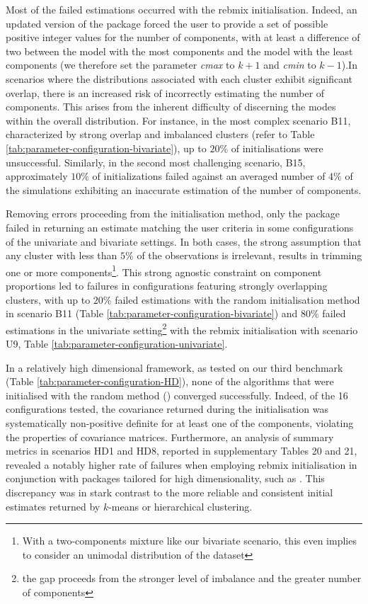 Most of the failed estimations occurred with the rebmix initialisation. Indeed, an updated version of the package forced the user to provide a set of possible positive integer values for the number of components, with at least a difference of two between the model with the most components and the model with the least components (we therefore set the parameter \emph{cmax} to \(k+1\) and \emph{cmin} to \(k-1\)).In scenarios where the distributions associated with each cluster exhibit significant overlap, there is an increased risk of incorrectly estimating the number of components. This arises from the inherent difficulty of discerning the modes within the overall distribution. For instance, in the most complex scenario B11, characterized by strong overlap and imbalanced clusters (refer to Table \ref{tab:parameter-configuration-bivariate}), up to \(20\%\) of initialisations were unsuccessful. Similarly, in the second most challenging scenario, B15, approximately \(10\%\) of initializations failed against an averaged number of \(4\%\) of the simulations exhibiting an inaccurate estimation of the number of components.

Removing errors proceeding from the initialisation method, only the  package failed in returning an estimate matching the user criteria in some configurations of the univariate and bivariate settings. In both cases, the strong assumption that any cluster with less than \(5\%\) of the observations is irrelevant, results in trimming one or more components\footnote{With a two-components mixture like our bivariate scenario, this even implies to consider an unimodal distribution of the dataset}. This strong agnostic constraint on component proportions led to failures in configurations featuring strongly overlapping clusters, with up to \(20\%\) failed estimations with the random initialisation method in scenario B11 (Table \ref{tab:parameter-configuration-bivariate}) and \(80\%\) failed estimations in the univariate setting\footnote{the gap proceeds from the stronger level of imbalance and the greater number of components} with the rebmix initialisation with scenario U9, Table \ref{tab:parameter-configuration-univariate}.

In a relatively high dimensional framework, as tested on our third benchmark (Table \ref{tab:parameter-configuration-HD}), none of the algorithms that were initialised with the random method () converged successfully. Indeed, of the 16 configurations tested, the covariance returned during the initialisation was systematically non-positive definite for at least one of the components, violating the properties of covariance matrices.
Furthermore, an analysis of summary metrics in scenarios HD1 and HD8, reported in supplementary Tables 20 and 21, revealed a notably higher rate of failures when employing rebmix initialisation in conjunction with packages tailored for high dimensionality, such as  . This discrepancy was in stark contrast to the more reliable and consistent initial estimates returned by \(k\)-means or hierarchical clustering.

